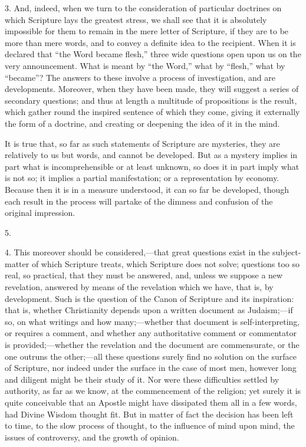 3. And, indeed, when we turn to the consideration of
particular doctrines on which Scripture lays the greatest
stress, we shall see that it is absolutely impossible for
them to remain in the mere letter of Scripture, if they
are to be more than mere words, and to convey a definite
idea to the recipient. When it is declared that ``the
Word became flesh,'' three wide questions open upon
us on the very announcement. What is meant by ``the
Word,'' what by ``flesh,'' what by
``became''? The answers to these involve a
process of investigation, and are developments. Moreover,
when they have been made, they will suggest a series of
secondary questions; and thus at length a multitude of
propositions is the result, which gather round the
inspired sentence of which they come, giving it
externally the form of a doctrine, and creating or
deepening the idea of it in the mind.

It is true that, so far as such statements of
Scripture are mysteries, they are relatively to us but
words, and cannot be developed. But as a mystery implies
in part what is incomprehensible or at least unknown, so
does it in part imply what is not so; it implies a
partial manifestation; or a representation by economy.
Because then it is in a measure understood, it can so far
be developed, though each result in the process will
partake of the dimness and confusion of the original
impression.

5.

4. This moreover should be considered,—that great
questions exist in the subject-matter of which Scripture
treats, which Scripture does not solve; questions too so
real, so practical, that they must be answered, and,
unless we suppose a new revelation, answered by means of
the revelation which we have, that is, by development.
Such is the question of the Canon of Scripture and its
inspiration: that is, whether Christianity depends upon a
written document as Judaism;—if so, on what writings
and how many;—whether that document is
self-interpreting, or requires a comment, and whether any
authoritative comment or commentator is
provided;—whether the revelation and the document
are commensurate, or the one outruns the other;—all
these questions surely find no solution on the surface of
Scripture, nor indeed under the surface in the case of
most men, however long and diligent might be their study
of it. Nor were these difficulties settled by authority,
as far as we know, at the commencement of the religion;
yet surely it is quite conceivable that an Apostle might
have dissipated them all in a few words, had Divine
Wisdom thought fit. But in matter of fact the decision
has been left to time, to the slow process of thought, to
the influence of mind upon mind, the issues of
controversy, and the growth of opinion.

